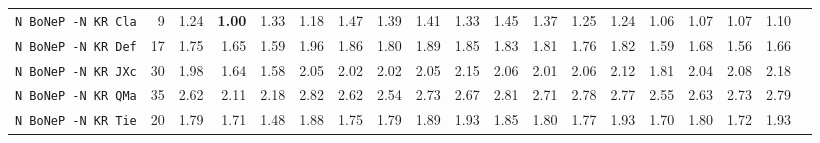 \begin{tabular}{l | r @{~~} r | r@{~~}r@{~~}r@{~~}r@{~~}r@{~~}r@{~~}r@{~~}r@{~~}r@{~~}r@{~~}r@{~~}r@{~~}r@{~~}r@{~~}r@{~~}r|}
\verb+N BoNeP -N KR Cla+ & 9 & 1.24 & \textbf{1.00}&1.33&1.18&1.47&1.39&1.41&1.33&1.45&1.37&1.25&1.24&1.06&1.07&1.07&1.10\\
\verb+N BoNeP -N KR Def+ & 17 & 1.75 & 1.65&1.59&1.96&1.86&1.80&1.89&1.85&1.83&1.81&1.76&1.82&1.59&1.68&1.56&1.66\\
\verb+N BoNeP -N KR JXc+ & 30 & 1.98 & 1.64&1.58&2.05&2.02&2.02&2.05&2.15&2.06&2.01&2.06&2.12&1.81&2.04&2.08&2.18\\
\verb+N BoNeP -N KR QMa+ & 35 & 2.62 & 2.11&2.18&2.82&2.62&2.54&2.73&2.67&2.81&2.71&2.78&2.77&2.55&2.63&2.73&2.79\\
\verb+N BoNeP -N KR Tie+ & 20 & 1.79 & 1.71&1.48&1.88&1.75&1.79&1.89&1.93&1.85&1.80&1.77&1.93&1.70&1.80&1.72&1.93\\
\end{tabular}
